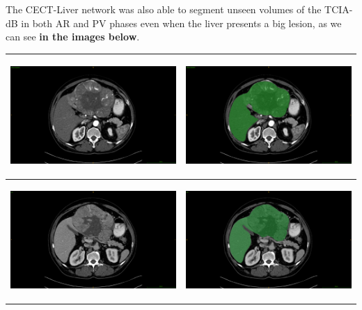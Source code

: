 \documentclass[]{article}
\begin{document}
The CECT-Liver network was also able to segment unseen volumes of the
TCIA-dB in both AR and PV phases even when the liver presents a big
lesion, as we can see \textbf{in the images below}.

\begin{longtable}[c]{@{}ll@{}}
\toprule
\includegraphics[width=2.97917in,height=1.75000in]{./images/media/image11.png}
&
\includegraphics[width=2.97917in,height=1.75000in]{./images/media/image12.png}\tabularnewline
\midrule
\endhead
\includegraphics[width=2.97917in,height=1.75000in]{./images/media/image16.png}
&
\includegraphics[width=2.97917in,height=1.75000in]{./images/media/image18.png}\tabularnewline
\bottomrule
\end{longtable}
\end{document}
